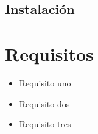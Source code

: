 \subsection{Instalación}

\section{Requisitos}

\begin{itemize}[itemsep=2pt]
    \item Requisito uno
    \item Requisito dos
    \item Requisito tres
\end{itemize}